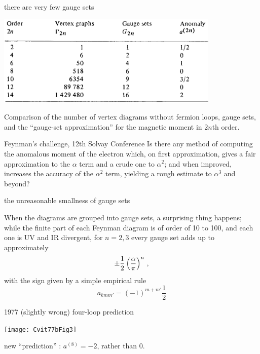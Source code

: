 \begin{frame}{there are very few gauge sets}
\begin{center}
\includegraphics[width=0.80\textwidth]{../../figs/Cvit77bTab1}
\end{center}
{\scriptsize  %
Comparison of the number of vertex diagrams without fermion loops, gauge
sets, and the ``gauge-set approximation'' for the magnetic
moment in $2n$th order.
}
\end{frame}

\begin{frame}{Feynman's challenge, 12th Solvay Conference}
Is there any method of computing the anomalous moment of the
electron which, on first approximation, gives a fair approximation to the
$\alpha$ term and a crude one to $\alpha^2$; and when improved, increases
the accuracy of the $\alpha^2$ term, yielding a rough estimate to
$\alpha^3$ and beyond?
\end{frame}

\begin{frame}{the unreasonable smallness of gauge sets}

When the diagrams are grouped into
gauge sets,
a surprising thing happens; while the
finite part of each Feynman diagram is of order of 10 to 100,
and each one is UV and IR divergent, for $n=2,3$
every gauge set adds up to approximately
\[
		   \pm {1 \over 2} \left(\frac{\alpha}{\pi}\right)^n
\,,
\]
with the sign given by a simple empirical rule
\[
a_{kmm'} = (-1)^{m+m'}\frac{1}{2}
\] %
\end{frame}


\begin{frame}{1977 (slightly wrong) four-loop prediction}
\begin{center}
\texttt{[image: Cvit77bFig3]}
\end{center}

{\scriptsize  %
new ``prediction'' : $a^{(8)}=-2$, rather than 0.
}
\end{frame}



